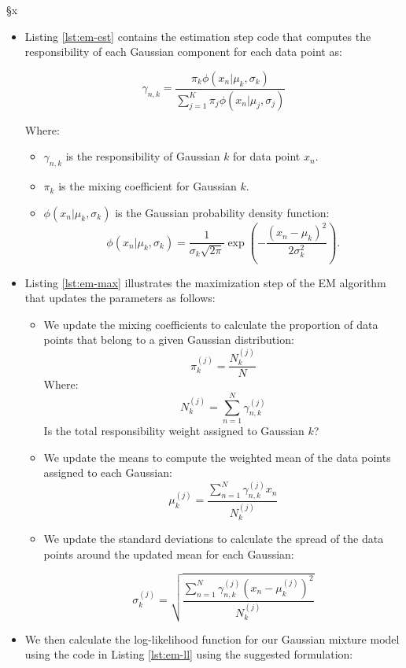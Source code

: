 §x\documentclass[]{article}
\begin{document}
\begin{itemize}
	\item Listing \ref{lst:em-est} contains the estimation step code that computes the responsibility of each Gaussian component for each data point as:
	
	$$
	\gamma_{n,k} = \frac{\pi_k \phi(x_n | \mu_k, \sigma_k)}{\sum_{j=1}^{K} \pi_j \phi(x_n | \mu_j, \sigma_j)}
	$$
	
	Where:
	\begin{itemize}
		\item $\gamma_{n,k}$ is the responsibility of Gaussian $k$ for data point $x_n$.
		\item $\pi_k$ is the mixing coefficient for Gaussian $k$.
		\item $\phi(x_n | \mu_k, \sigma_k)$ is the Gaussian probability density function:
		$$
		\phi(x_n | \mu_k, \sigma_k) = \frac{1}{\sigma_k \sqrt{2\pi}} \exp \left( -\frac{(x_n - \mu_k)^2}{2\sigma_k^2} \right).
		$$
	\end{itemize}	
	
	
	\item Listing \ref{lst:em-max} illustrates the maximization step of the EM algorithm that updates the parameters as follows:
	
	\begin{itemize}
		\item We update the mixing coefficients to calculate the proportion of data points that belong to a given Gaussian distribution:
		$$
		\pi_k^{(j)} = \frac{N_k^{(j)}}{N}
		$$
		Where:
		$$
		N_k^{(j)} = \sum_{n=1}^{N} \gamma_{n,k}^{(j)}
		$$
		Is the total responsibility weight assigned to Gaussian $k$?
		
		\item We update the means to compute the weighted mean of the data points assigned to each Gaussian:
		$$
		\mu_k^{(j)} = \frac{\sum_{n=1}^{N} \gamma_{n,k}^{(j)} x_n}{N_k^{(j)}}
		$$
		
		\item We update the standard deviations to calculate the spread of the data points around the updated mean for each Gaussian:
		
		$$
		\sigma_k^{(j)} = \sqrt{\frac{\sum_{n=1}^{N} \gamma_{n,k}^{(j)} (x_n - \mu_k^{(j)})^2}{N_k^{(j)}}}
		$$
	\end{itemize}
	
	
	\item We then calculate the log-likelihood function for our Gaussian mixture model using the code in Listing \ref{lst:em-ll} using the suggested formulation:
	

\end{itemize}
\end{document}
